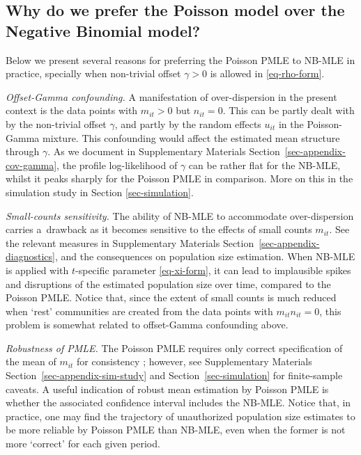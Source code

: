 \subsection{Why do we prefer the Poisson model over the Negative Binomial model?}\label{sec-append-why-poisson}

Below we present several reasons for preferring the Poisson PMLE to NB-MLE in practice, specially when non-trivial offset $\gamma >0$ is allowed in \eqref{eq-rho-form}. 


\emph{Offset-Gamma confounding.} A manifestation of over-dispersion in the present context is the data points with $m_{it} >0$ but $n_{it} =0$. This can be partly dealt with by the non-trivial offset $\gamma$, and partly by the random effects $u_{it}$ in the Poisson-Gamma mixture. This confounding would affect the estimated mean structure through $\gamma$. As we document in Supplementary Materials Section~\ref{sec-appendix-cov-gamma}, the profile log-likelihood of $\gamma$ can be rather flat for the NB-MLE, whilst it peaks sharply for the Poisson PMLE in comparison. More on this in the simulation study in Section \ref{sec-simulation}.

\emph{Small-counts sensitivity.} The ability of NB-MLE to accommodate over-dispersion carries a~drawback as it becomes sensitive to the effects of small counts $m_{it}$. See the relevant measures in Supplementary Materials Section~\ref{sec-appendix-diagnostics}, and the consequences on population size estimation. When NB-MLE is applied with $t$-specific parameter \eqref{eq-xi-form}, it can lead to implausible spikes and disruptions of the estimated population size over time, compared to the Poisson PMLE. Notice that, since the extent of small counts is much reduced when `rest' communities are created from the data points with $m_{it} n_{it} =0$, this problem is somewhat related to offset-Gamma confounding above. 

\emph{Robustness of PMLE.} The Poisson PMLE requires only correct specification of the mean of $m_{it}$ for consistency \citep{SantosSilvaTenreyro2006}; however, see Supplementary Materials Section~\ref{sec-appendix-sim-study} and Section~\ref{sec-simulation} for finite-sample caveats. A useful indication of robust mean estimation by Poisson PMLE is whether the associated confidence interval includes the NB-MLE. Notice that, in practice, one may find the trajectory of unauthorized population size estimates to be more reliable by Poisson PMLE than NB-MLE, even when the former is not more `correct' for each given period. 


